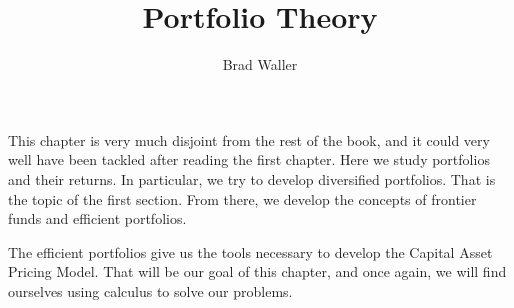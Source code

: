 \documentclass{ximera}
\title{Portfolio Theory}
\author{Brad Waller}
\begin{document}
\maketitle

This chapter is very much disjoint from the rest of the book, and it could very well have been tackled after reading the first chapter. Here we study portfolios and their returns. In particular, we try to develop diversified portfolios. That is the topic of the first section. From there, we develop the concepts of frontier funds and efficient portfolios. 

The efficient portfolios give us the tools necessary to develop the Capital Asset Pricing Model. That will be our goal of this chapter, and once again, we will find ourselves using calculus to solve our problems. 
\end{document}
